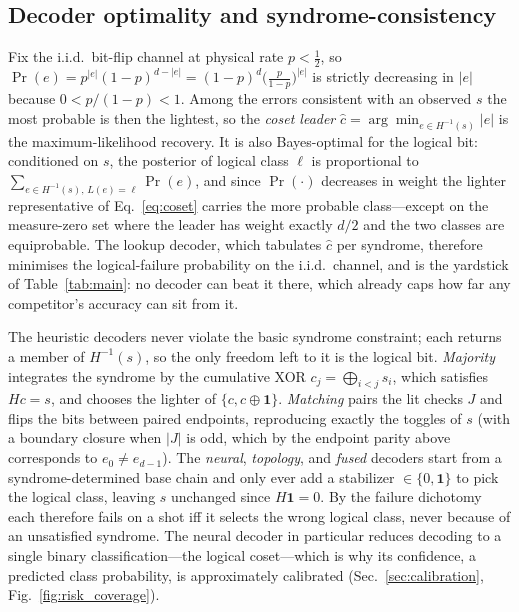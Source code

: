 \documentclass[reprint,aps,prxquantum,amsmath,amssymb,floatfix,nofootinbib,longbibliography]{revtex4-2}
\theoremstyle{definition}
\theoremstyle{remark}
\theoremstyle{plain}
\newcommand{\abs}[1]{\left\lvert #1 \right\rvert}
\begin{document}
\subsection{Decoder optimality and syndrome-consistency}
\label{sec:theory_decoders}

Fix the i.i.d.\ bit-flip channel at physical rate $p<\tfrac12$, so $\Pr(e)=p^{\abs e}(1-p)^{d-\abs e}=(1-p)^d\bigl(\tfrac{p}{1-p}\bigr)^{\abs e}$ is strictly decreasing in $\abs e$ because $0<p/(1-p)<1$. Among the errors consistent with an observed $s$ the most probable is then the lightest, so the \emph{coset leader} $\hat c=\arg\min_{e\in H^{-1}(s)}\abs e$ is the maximum-likelihood recovery. It is also Bayes-optimal for the logical bit: conditioned on $s$, the posterior of logical class $\ell$ is proportional to $\sum_{e\in H^{-1}(s),\,L(e)=\ell}\Pr(e)$, and since $\Pr(\cdot)$ decreases in weight the lighter representative of Eq.~\eqref{eq:coset} carries the more probable class---except on the measure-zero set where the leader has weight exactly $d/2$ and the two classes are equiprobable. The lookup decoder, which tabulates $\hat c$ per syndrome, therefore minimises the logical-failure probability on the i.i.d.\ channel, and is the yardstick of Table~\ref{tab:main}: no decoder can beat it there, which already caps how far any competitor's accuracy can sit from it.

The heuristic decoders never violate the basic syndrome constraint; each returns a member of $H^{-1}(s)$, so the only freedom left to it is the logical bit. \emph{Majority} integrates the syndrome by the cumulative XOR $c_j=\bigoplus_{i<j}s_i$, which satisfies $Hc=s$, and chooses the lighter of $\{c,c\oplus\mathbf 1\}$. \emph{Matching} pairs the lit checks $J$ and flips the bits between paired endpoints, reproducing exactly the toggles of $s$ (with a boundary closure when $\abs J$ is odd, which by the endpoint parity above corresponds to $e_0\neq e_{d-1}$). The \emph{neural}, \emph{topology}, and \emph{fused} decoders start from a syndrome-determined base chain and only ever add a stabilizer $\in\{0,\mathbf 1\}$ to pick the logical class, leaving $s$ unchanged since $H\mathbf 1=0$. By the failure dichotomy each therefore fails on a shot iff it selects the wrong logical class, never because of an unsatisfied syndrome. The neural decoder in particular reduces decoding to a single binary classification---the logical coset---which is why its confidence, a predicted class probability, is approximately calibrated (Sec.~\ref{sec:calibration}, Fig.~\ref{fig:risk_coverage}).
\end{document}
